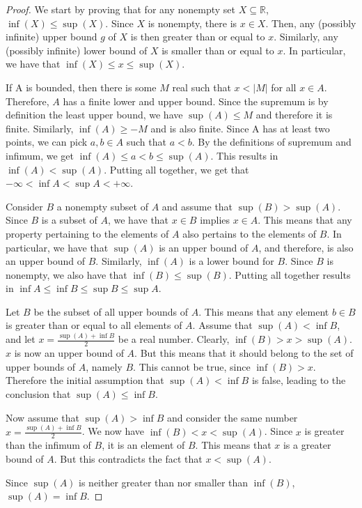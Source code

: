 \begin{proof}

We start by proving that for any nonempty set $X \subseteq \mathbb{R}$, $\inf(X) \leq \sup(X)$. Since $X$ is nonempty, there is $x \in X$. Then, any (possibly infinite) upper bound $g$ of $X$ is then greater than or equal to $x$. Similarly, any (possibly infinite) lower bound of $X$ is smaller than or equal to $x$. In particular, we have that $\inf(X) \leq x \leq \sup(X)$.


If A is bounded, then there is some $M$ real such that $x < |M|$ for all $x \in A$. Therefore, $A$ has a finite lower and upper bound. Since the supremum is by definition the least upper bound, we have $\sup(A) \leq M$ and therefore it is finite. Similarly, $\inf(A) \geq -M$ and is also finite. Since A has at least two points, we can pick $a,b \in A$ such that $a < b$. By the definitions of supremum and infimum, we get $\inf(A) \leq a < b \leq \sup(A)$. This results in $\inf(A) < \sup(A)$. Putting all together, we get that $-\infty < \inf A < \sup A < +\infty$.

\vspace{8mm}

Consider $B$ a nonempty subset of $A$ and assume that $\sup(B) > \sup(A)$. Since $B$ is a subset of $A$, we have that $x \in B$ implies $x \in A$. This means that any property pertaining to the elements of $A$ also pertains to the elements of $B$. In particular, we have that $\sup(A)$ is an upper bound of $A$, and therefore, is also an upper bound of $B$. Similarly, $\inf(A)$ is a lower bound for $B$. Since $B$ is nonempty, we also have that $\inf(B) \leq \sup(B)$. Putting all together results in $\inf A \leq \inf B \leq \sup B \leq \sup A$.

\vspace{8mm}

Let $B$ be the subset of all upper bounds of $A$. This means that any element $b \in B$ is greater than or equal to all elements of $A$. Assume that $\sup(A) < \inf{B}$, and let $x = \frac{\sup(A) + \inf{B}}{2}$ be a real number. Clearly, $\inf(B) > x > \sup(A)$. $x$ is now an upper bound of $A$. But this means that it should belong to the set of upper bounds of $A$, namely $B$. This cannot be true, since $\inf(B) > x$. Therefore the initial assumption that $\sup(A) < \inf{B}$ is false, leading to the conclusion that $\sup(A) \leq \inf{B}$. 

Now assume that $\sup(A) > \inf{B}$ and consider the same number $x = \frac{\sup(A) + \inf{B}}{2}$. We now have $\inf(B) < x < \sup(A)$. Since $x$ is greater than the infimum of $B$, it is an element of $B$. This means that $x$ is a greater bound of $A$. But this contradicts the fact that $x < \sup(A)$. 

Since $\sup(A)$ is neither greater than nor smaller than $\inf(B)$, $\sup(A) = \inf{B}$.

\end{proof}

